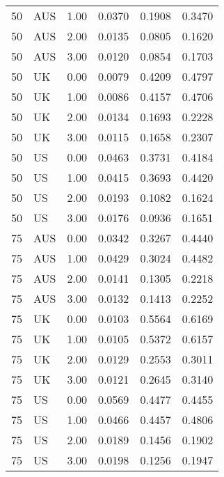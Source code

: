 \begin{table}[ht]
\begin{tabular}{llrlll}
  50 & AUS & 1.00 & 0.0370 & 0.1908 & 0.3470 \\ 
  50 & AUS & 2.00 & 0.0135 & 0.0805 & 0.1620 \\ 
  50 & AUS & 3.00 & 0.0120 & 0.0854 & 0.1703 \\ 
  50 & UK & 0.00 & 0.0079 & 0.4209 & 0.4797 \\ 
  50 & UK & 1.00 & 0.0086 & 0.4157 & 0.4706 \\ 
  50 & UK & 2.00 & 0.0134 & 0.1693 & 0.2228 \\ 
  50 & UK & 3.00 & 0.0115 & 0.1658 & 0.2307 \\ 
  50 & US & 0.00 & 0.0463 & 0.3731 & 0.4184 \\ 
  50 & US & 1.00 & 0.0415 & 0.3693 & 0.4420 \\ 
  50 & US & 2.00 & 0.0193 & 0.1082 & 0.1624 \\ 
  50 & US & 3.00 & 0.0176 & 0.0936 & 0.1651 \\ 
  75 & AUS & 0.00 & 0.0342 & 0.3267 & 0.4440 \\ 
  75 & AUS & 1.00 & 0.0429 & 0.3024 & 0.4482 \\ 
  75 & AUS & 2.00 & 0.0141 & 0.1305 & 0.2218 \\ 
  75 & AUS & 3.00 & 0.0132 & 0.1413 & 0.2252 \\ 
  75 & UK & 0.00 & 0.0103 & 0.5564 & 0.6169 \\ 
  75 & UK & 1.00 & 0.0105 & 0.5372 & 0.6157 \\ 
  75 & UK & 2.00 & 0.0129 & 0.2553 & 0.3011 \\ 
  75 & UK & 3.00 & 0.0121 & 0.2645 & 0.3140 \\ 
  75 & US & 0.00 & 0.0569 & 0.4477 & 0.4455 \\ 
  75 & US & 1.00 & 0.0466 & 0.4457 & 0.4806 \\ 
  75 & US & 2.00 & 0.0189 & 0.1456 & 0.1902 \\ 
  75 & US & 3.00 & 0.0198 & 0.1256 & 0.1947 \\ 
   \hline
\end{tabular}
\end{table}
